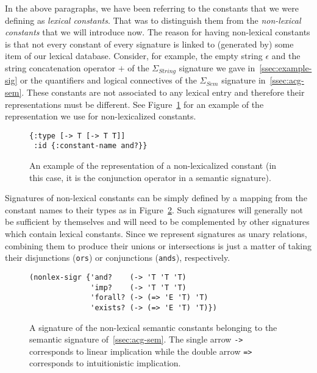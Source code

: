 In the above paragraphs, we have been referring to the constants that we
were defining as \emph{lexical constants}. That was to distinguish them
from the \emph{non-lexical constants} that we will introduce now. The
reason for having non-lexical constants is that not every constant of
every signature is linked to (generated by) some item of our lexical
database. Consider, for example, the empty string $\epsilon$ and the
string concatenation operator $+$ of the $\Sigma_{String}$ signature we
gave in~\ref{ssec:example-sig} or the quantifiers and logical
connectives of the $\Sigma_{Sem}$ signature in~\ref{ssec:acg-sem}.
These constants are not associated to any lexical entry and therefore
their representations must be different. See
Figure~\ref{fig:nonlex-const} for an example of the representation we
use for non-lexicalized constants.

\begin{figure}
  \centering
\begin{verbatim}
{:type [-> T [-> T T]]
 :id {:constant-name and?}}
\end{verbatim}
  \caption{\label{fig:nonlex-const} An example of the representation of
    a non-lexicalized constant (in this case, it is the conjunction
    operator in a semantic signature).}
\end{figure}

Signatures of non-lexical constants can be simply defined by a mapping
from the constant names to their types as in
Figure~\ref{fig:nonlex-sig-impl}. Such signatures will generally not be
sufficient by themselves and will need to be complemented by other
signatures which contain lexical constants. Since we represent
signatures as unary relations, combining them to produce their unions or
intersections is just a matter of taking their disjunctions
(\texttt{ors}) or conjunctions (\texttt{ands}), respectively.

\begin{figure}
  \centering
\begin{verbatim}
(nonlex-sigr {'and?    (-> 'T 'T 'T)
              'imp?    (-> 'T 'T 'T)
              'forall? (-> (=> 'E 'T) 'T)
              'exists? (-> (=> 'E 'T) 'T)})
\end{verbatim}
  \caption{\label{fig:nonlex-sig-impl} A signature of the non-lexical
    semantic constants belonging to the semantic signature
    of~\ref{ssec:acg-sem}. The single arrow \texttt{->} corresponds to
    linear implication while the double arrow \texttt{=>} corresponds to
    intuitionistic implication.}
\end{figure}

